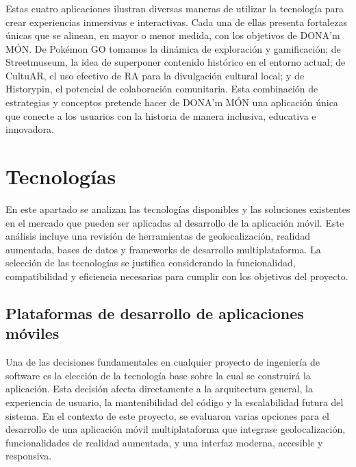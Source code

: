\subsubsection{}

Estas cuatro aplicaciones ilustran diversas maneras de utilizar la tecnología para crear experiencias inmersivas e interactivas. Cada una de ellas presenta fortalezas únicas que se alinean, en mayor o menor medida, con los objetivos de DONA'm MÓN. De Pokémon GO tomamos la dinámica de exploración y gamificación; de Streetmuseum, la idea de superponer contenido histórico en el entorno actual; de CultuAR, el uso efectivo de RA para la divulgación cultural local; y de Historypin, el potencial de colaboración comunitaria. Esta combinación de estrategias y conceptos pretende hacer de DONA'm MÓN una aplicación única que conecte a los usuarios con la historia de manera inclusiva, educativa e innovadora.



\section{Tecnologías}
En este apartado se analizan las tecnologías disponibles y las soluciones existentes en el mercado que pueden ser aplicadas al desarrollo de la aplicación móvil. Este análisis incluye una revisión de herramientas de geolocalización, realidad aumentada, bases de datos y frameworks de desarrollo multiplataforma. La selección de las tecnologías se justifica considerando la funcionalidad, compatibilidad y eficiencia necesarias para cumplir con los objetivos del proyecto.

\subsection{Plataformas de desarrollo de aplicaciones móviles}

Una de las decisiones fundamentales en cualquier proyecto de ingeniería de software es la elección de la tecnología base sobre la cual se construirá la aplicación. Esta decisión afecta directamente a la arquitectura general, la experiencia de usuario, la mantenibilidad del código y la escalabilidad futura del sistema. En el contexto de este proyecto, se evaluaron varias opciones para el desarrollo de una aplicación móvil multiplataforma que integrase geolocalización, funcionalidades de realidad aumentada, y una interfaz moderna, accesible y responsiva.

